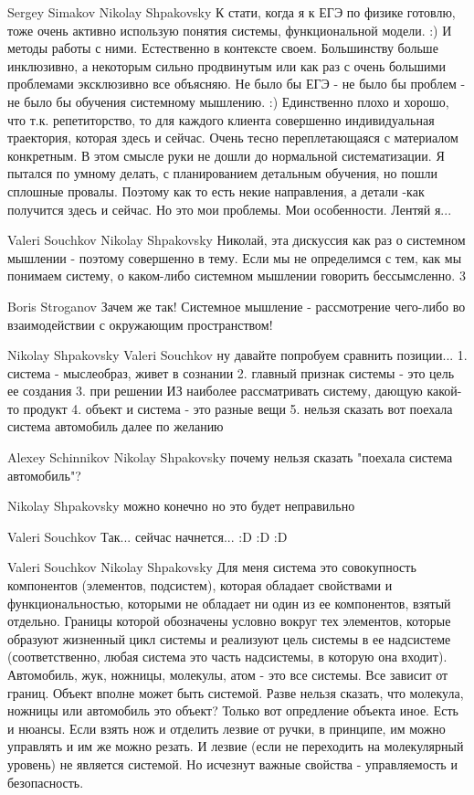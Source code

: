 \documentclass[11pt,a4paper]{article}
\begin{document}
Sergey Simakov Nikolay Shpakovsky К стати, когда я к ЕГЭ по физике готовлю,
тоже очень активно использую понятия системы, функциональной модели. :) И
методы работы с ними. Естественно в контексте своем.  Большинству больше
инклюзивно, а некоторым сильно продвинутым или как раз с очень большими
проблемами эксклюзивно все объясняю.  Не было бы ЕГЭ - не было бы проблем - не
было бы обучения системному мышлению. :) Единственно плохо и хорошо, что
т.к. репетиторство, то для каждого клиента совершенно индивидуальная
траектория, которая здесь и сейчас. Очень тесно переплетающаяся с материалом
конкретным. В этом смысле руки не дошли до нормальной систематизации.  Я
пытался по умному делать, с планированием детальным обучения, но пошли
сплошные провалы. Поэтому как то есть некие направления, а детали -как
получится здесь и сейчас.  Но это мои проблемы. Мои особенности. Лентяй я...

Valeri Souchkov Nikolay Shpakovsky Николай, эта дискуссия как раз о системном
мышлении - поэтому совершенно в тему. Если мы не определимся с тем, как мы
понимаем систему, о каком-либо системном мышлении говорить бессымсленно.  3

Boris Stroganov Зачем же так! Системное мышление - рассмотрение чего-либо во
взаимодействии с окружающим пространством!

Nikolay Shpakovsky Valeri Souchkov ну давайте попробуем сравнить позиции...
1. система - мыслеобраз, живет в сознании 2. главный признак системы - это
цель ее создания 3. при решении ИЗ наиболее рассматривать систему, дающую
какой-то продукт 4. объект и система - это разные вещи 5. нельзя сказать вот
поехала система автомобиль далее по желанию

Alexey Schinnikov Nikolay Shpakovsky почему нельзя сказать "поехала система
автомобиль"?

Nikolay Shpakovsky можно конечно но это будет неправильно

Valeri Souchkov Так... сейчас начнется... :D :D :D

Valeri Souchkov Nikolay Shpakovsky Для меня система это совокупность
компонентов (элементов, подсистем), которая обладает свойствами и
функциональностью, которыми не обладает ни один из ее компонентов, взятый
отдельно. Границы которой обозначены условно вокруг тех элементов, которые
образуют жизненный цикл системы и реализуют цель системы в ее надсистеме
(соответственно, любая система это часть надсистемы, в которую она
входит). Автомобиль, жук, ножницы, молекулы, атом - это все системы. Все
зависит от границ. Объект вполне может быть системой. Разве нельзя сказать,
что молекула, ножницы или автомобиль это объект? Только вот опредление объекта
иное. Есть и нюансы. Если взять нож и отделить лезвие от ручки, в принципе, им
можно управлять и им же можно резать. И лезвие (если не переходить на
молекулярный уровень) не является системой. Но исчезнут важные свойства -
управляемость и безопасность.
\end{document}
